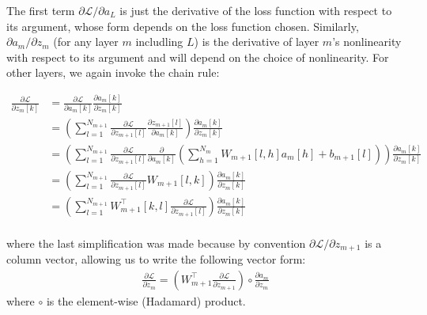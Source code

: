 The first term $\partial \mathcal{L}/\partial a_L$ is just the derivative of the loss function with respect to its argument, whose form depends on the loss function chosen.
Similarly, $\partial a_m/\partial z_m$ (for any layer $m$ includling $L$) is the derivative of layer $m$'s nonlinearity with respect to its argument and will depend on the choice of nonlinearity.
For other layers, we again invoke the chain rule:

\begin{align}
        \frac{\partial \mathcal{L}}{\partial z_m[k]} &= \frac{\partial \mathcal{L}}{\partial a_m[k]} \frac{\partial a_m[k]}{\partial z_m[k]}\\
                                                     &= \left(\sum_{l = 1}^{N_{m + 1}}\frac{\partial \mathcal{L}}{\partial z_{m + 1}[l]}\frac{\partial z_{m + 1}[l]}{\partial a_m[k]}\right)\frac{\partial a_m[k]}{\partial z_m[k]}\\
                                                     &= \left(\sum_{l = 1}^{N_{m + 1}}\frac{\partial \mathcal{L}}{\partial z_{m + 1}[l]}\frac{\partial}{\partial a_m[k]} \left(\sum_{h = 1}^{N_m} W_{m + 1}[l, h] a_m[h] + b_{m + 1}[l]\right)\right) \frac{\partial a_m[k]}{\partial z_m[k]}\\
                                                     &= \left(\sum_{l = 1}^{N_{m + 1}}\frac{\partial \mathcal{L}}{\partial z_{m + 1}[l]} W_{m + 1}[l, k]\right) \frac{\partial a_m[k]}{\partial z_m[k]}\\
                                                     &= \left(\sum_{l = 1}^{N_{m + 1}}W_{m + 1}^\top[k, l] \frac{\partial \mathcal{L}}{\partial z_{m + 1}[l]}\right) \frac{\partial a_m[k]}{\partial z_m[k]}\\
\end{align}

where the last simplification was made because by convention $\partial \mathcal{L}/\partial z_{m + 1}$ is a column vector, allowing us to write the following vector form:
\begin{align}
        \frac{\partial \mathcal{L}}{\partial z_m} = \left(W_{m + 1}^\top \frac{\partial \mathcal{L}}{\partial z_{m + 1}}\right) \circ \frac{\partial a_m}{\partial z_m}
\label{eq:L_wrt_z_m}
\end{align}
where $\circ$ is the element-wise (Hadamard) product.

